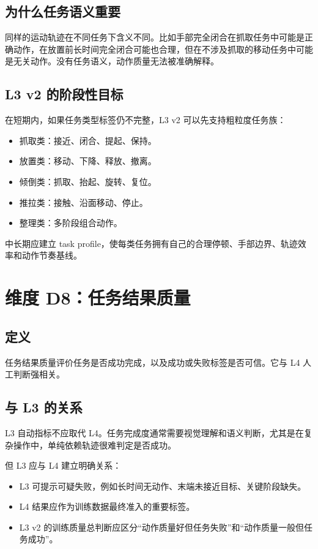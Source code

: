 \documentclass[UTF8,zihao=-4,oneside,openany]{ctexrep}
\begin{document}
\subsection{为什么任务语义重要}

同样的运动轨迹在不同任务下含义不同。比如手部完全闭合在抓取任务中可能是正确动作，在放置前长时间完全闭合可能也合理，但在不涉及抓取的移动任务中可能是无关动作。没有任务语义，动作质量无法被准确解释。

\subsection{L3 v2 的阶段性目标}

在短期内，如果任务类型标签仍不完整，L3 v2 可以先支持粗粒度任务族：

\begin{itemize}
  \item 抓取类：接近、闭合、提起、保持。
  \item 放置类：移动、下降、释放、撤离。
  \item 倾倒类：抓取、抬起、旋转、复位。
  \item 推拉类：接触、沿面移动、停止。
  \item 整理类：多阶段组合动作。
\end{itemize}

中长期应建立 task profile，使每类任务拥有自己的合理停顿、手部边界、轨迹效率和动作节奏基线。

\section{维度 D8：任务结果质量}

\subsection{定义}

任务结果质量评价任务是否成功完成，以及成功或失败标签是否可信。它与 L4 人工判断强相关。

\subsection{与 L3 的关系}

L3 自动指标不应取代 L4。任务完成度通常需要视觉理解和语义判断，尤其是在复杂操作中，单纯依赖轨迹很难判定是否成功。

但 L3 应与 L4 建立明确关系：

\begin{itemize}
  \item L3 可提示可疑失败，例如长时间无动作、末端未接近目标、关键阶段缺失。
  \item L4 结果应作为训练数据最终准入的重要标签。
  \item L3 v2 的训练质量总判断应区分“动作质量好但任务失败”和“动作质量一般但任务成功”。
\end{itemize}
\end{document}
